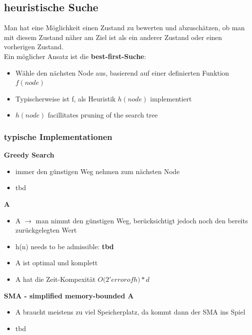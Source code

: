 \documentclass{article}
\theoremstyle{merke}
\theoremstyle{definition}
\begin{document}
\subsection{heuristische Suche}
Man hat eine Möglichkeit einen Zustand zu bewerten und abzuschätzen, ob man mit diesem Zustand näher am Ziel ist als ein anderer Zustand oder einen vorherigen Zustand.\\
Ein möglicher Ansatz ist die \textbf{best-first-Suche}:\\
\begin{itemize}
\item Wähle den nächsten Node aus, basierend auf einer definierten Funktion $f(node)$
\item Typischerweise ist f, als Heuristik $h(node)$ implementiert
\item $h(node)$ facillitates pruning of the search tree
\end{itemize}

\subsubsection{typische Implementationen}
\textbf{Greedy Search}
\begin{itemize}
\item{immer den günstigen Weg nehmen zum nächsten Node}
\item{tbd}
\end{itemize}

\textbf{A\*}
\begin{itemize}
\item{A\* $\rightarrow$ man nimmt den günstigen Weg, berücksichtigt jedoch noch den bereits zurückgelegten Wert}
\item h(n) needs to be admissible: \textbf{tbd}
\item A\* ist optimal und komplett
\item A\* hat die Zeit-Kompexität $O(2'{error of h) * d}$
\end{itemize}

\textbf{SMA\* - simplified memory-bounded A\*}
\begin{itemize}
\item{A\* braucht meistens zu viel Speicherplatz, da kommt dann der SMA ins Spiel}
\item{tbd}
\end{itemize}























 
\end{document}
